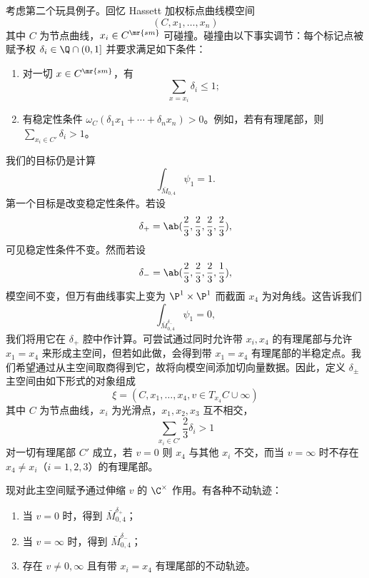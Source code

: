 \begin{exm}
    考虑第二个玩具例子。回忆 Hassett 加权标点曲线模空间
    \[ (C, x_1, \ldots, x_n) \]
    其中 \(C\) 为节点曲线，\(x_i \in C^{\mr{sm}}\) 可碰撞。碰撞由以下事实调节：每个标记点被赋予权 \(\delta_i \in \Q \cap (0,1]\) 并要求满足如下条件：
    \begin{enumerate}
        \item 对一切 \(x \in C^{\mr{sm}}\)，有
            \[ \sum_{x = x_i} \delta_i \leq 1; \]
        \item 有稳定性条件 \(\omega_C(\delta_1 x_1 + \cdots + \delta_n x_n) > 0\)。例如，若有有理尾部，则 \(\sum_{x_i \in C'} \delta_i > 1\)。
    \end{enumerate}
\end{exm}

\begin{exm}
    我们的目标仍是计算
    \[ \int_{\bar{M}_{0,4}} \psi_1 = 1. \]
    第一个目标是改变稳定性条件。若设
    \[ \delta_+ = \ab(\frac{2}{3}, \frac{2}{3}, \frac{2}{3}, \frac{2}{3}), \]
    可见稳定性条件不变。然而若设
    \[ \delta_- = \ab(\frac{2}{3}, \frac{2}{3}, \frac{2}{3}, \frac{1}{3}), \]
    模空间不变，但万有曲线事实上变为 \(\P^1 \times \P^1\) 而截面 \(x_4\) 为对角线。这告诉我们
    \[ \int_{\bar{M}_{0,4}^{\delta_-}} \psi_1 = 0, \]
    我们将用它在 \(\delta_+\) 腔中作计算。可尝试通过同时允许带 \(x_i, x_4\) 的有理尾部与允许 \(x_1 = x_4\) 来形成主空间，但若如此做，会得到带 \(x_1 = x_4\) 有理尾部的半稳定点。我们希望通过从主空间取商得到它，故将向模空间添加切向量数据。因此，定义 \(\delta_{\pm}\) 主空间由如下形式的对象组成
    \[ \xi = (C, x_1, \ldots, x_4, v \in T_{x_4} C \cup \infty) \]
    其中 \(C\) 为节点曲线，\(x_i\) 为光滑点，\(x_1, x_2, x_3\) 互不相交，
    \[ \sum_{x_i \in C'} \frac{2}{3} \delta_i > 1 \]
    对一切有理尾部 \(C'\) 成立，若 \(v = 0\) 则 \(x_4\) 与其他 \(x_i\) 不交，而当 \(v = \infty\) 时不存在 \(x_4 \neq x_i\)（\(i=1,2,3\)）的有理尾部。

    现对此主空间赋予通过伸缩 \(v\) 的 \(\C^{\times}\) 作用。有各种不动轨迹：
    \begin{enumerate}
        \item 当 \(v = 0\) 时，得到 \(\bar{M}_{0,4}^{\delta_+}\)；
        \item 当 \(v = \infty\) 时，得到 \(\bar{M}_{0,4}^{\delta_-}\)；
        \item 存在 \(v \neq 0,\infty\) 且有带 \(x_i = x_4\) 有理尾部的不动轨迹。
    \end{enumerate}


\end{exm}
